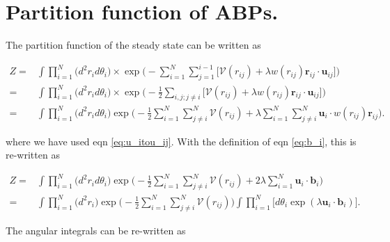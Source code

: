 \documentclass[twocolumn,amsmath,amssymb,aps]{revtex4-1}%
\begin{document}
\section{Partition function of ABPs. \label{app:statmech}}
The partition function of the steady state can be written as
\begin{widetext}
\begin{align}
  Z =&\int\prod_{i=1}^N\big(d^2r_id\theta_i)
       \times\exp\bigg(-\sum_{i=1}^N\sum_{j=1}^{i-1}\big[
       \mathcal{V}(r_{ij})+\lambda w(r_{ij})\bm{r}_{ij}
       \cdot\bm{u}_{ij}\big]\bigg)\nonumber\\
  =&\int\prod_{i=1}^N\big(d^2r_id\theta_i)
     \times\exp\bigg(-\frac{1}{2}\sum_{i,j;j\neq i}\big[
     \mathcal{V}(r_{ij})+\lambda w(r_{ij})\bm{r}_{ij}
     \cdot\bm{u}_{ij}\big]\bigg)\nonumber\\
  =&\int\prod_{i=1}^N\big(d^2r_id\theta_i)
     \exp\bigg(-\frac{1}{2}\sum_{i=1}^N\sum_{j\neq i}^N
     \mathcal{V}(r_{ij})
     +\lambda\sum_{i=1}^N\sum_{j\neq i}^N\bm{u}_{i}
     \cdot w(r_{ij})\bm{r}_{ij}\bigg).
\end{align}
\end{widetext}
where we have used eqn \ref{eq:u_itou_ij}. With the definition of eqn
\ref{eq:b_i}, this is re-written as
\begin{widetext}
\begin{align}
  Z=&\int\prod_{i=1}^N\big(d^2r_id\theta_i)
     \exp\bigg(-\frac{1}{2}\sum_{i=1}^N\sum_{j\neq i}^N
     \mathcal{V}(r_{ij})+2\lambda\sum_{i=1}^N\bm{u}_{i}
     \cdot \bm{b}_{i}\bigg)\nonumber\\
  =&\int\prod_{i=1}^N\big(d^2r_i)
     \exp\bigg(-\frac{1}{2}\sum_{i=1}^N\sum_{j\neq i}^N
     \mathcal{V}(r_{ij})\bigg)\int\prod_{i=1}^N\bigg[d\theta_i
     \exp(\lambda\bm{u}_{i}\cdot \bm{b}_{i})\bigg].
\end{align}
\end{widetext}
The angular integrals can be re-written as
\end{document}
